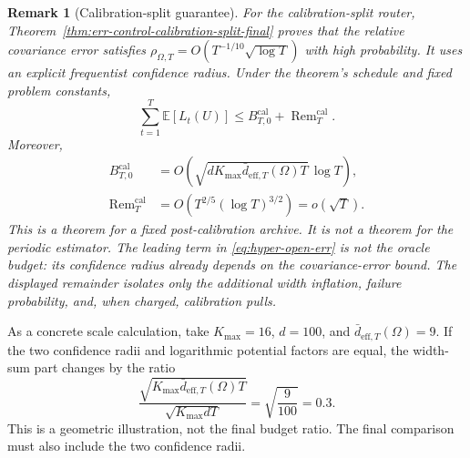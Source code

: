 \documentclass{article} %
\newtheorem{remark}{Remark}
\begin{document}
\begin{remark}[Calibration-split guarantee]
For the calibration-split router, Theorem~\ref{thm:err-control-calibration-split-final} proves that the relative covariance error satisfies $\rho_{\Omega,T}=O(T^{-1/10}\sqrt{\log T})$ with high probability. It uses an explicit frequentist confidence radius. Under the theorem's schedule and fixed problem constants,
\begin{equation}
\label{eq:hyper-open-err}
\sum_{t=1}^{T}\mathbb{E}[L_t(U)]
\le
B_{T,0}^{\mathrm{cal}}
+
\operatorname{Rem}_T^{\mathrm{cal}}.
\end{equation}
Moreover,
\begin{equation}
\label{eq:hyper-open-rates}
\begin{aligned}
B_{T,0}^{\mathrm{cal}}
&=
O\!\left(
\sqrt{dK_{\max}\bar d_{\mathrm{eff},T}(\Omega)T}\,\log T
\right),\\
\operatorname{Rem}_T^{\mathrm{cal}}
&=
O\!\left(T^{2/5}(\log T)^{3/2}\right)
=o(\sqrt T).
\end{aligned}
\end{equation}
This is a theorem for a fixed post-calibration archive. It is not a theorem for the periodic estimator.
The leading term in \eqref{eq:hyper-open-err} is not the oracle budget: its
confidence radius already depends on the covariance-error bound. The displayed
remainder isolates only the additional width inflation, failure probability,
and, when charged, calibration pulls.
\end{remark}

As a concrete scale calculation, take \(K_{\max}=16\), \(d=100\), and
\(\bar d_{\mathrm{eff},T}(\Omega)=9\).
If the two confidence radii and logarithmic potential factors are equal, the width-sum part changes by the ratio
\begin{equation}
\label{eq:hyper-example-ratio}
\frac{
\sqrt{K_{\max}\bar d_{\mathrm{eff},T}(\Omega)T}
}{
\sqrt{K_{\max}dT}
}
=
\sqrt{\frac{9}{100}}
=
0.3.
\end{equation}
This is a geometric illustration, not the final budget ratio. The final comparison must also include the two confidence radii.
\end{document}
